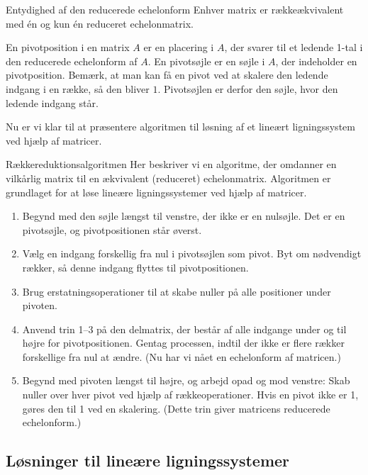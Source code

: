 \begin{theorem}{Entydighed af den reducerede echelonform}
    Enhver matrix er rækkeækvivalent med én og kun én reduceret echelonmatrix.
\end{theorem}

En pivotposition i en matrix $A$ er en placering i $A$, der svarer til et ledende 1-tal i den reducerede echelonform af $A$. En pivotsøjle er en søjle i $A$, der indeholder en pivotposition. Bemærk, at man kan få en pivot ved at skalere den ledende indgang i en række, så den bliver $1$. Pivotsøjlen er derfor den søjle, hvor den ledende indgang står.

Nu er vi klar til at præsentere algoritmen til løsning af et lineært ligningssystem ved hjælp af matricer.

\begin{custombox}{Rækkereduktionsalgoritmen}
    Her beskriver vi en algoritme, der omdanner en vilkårlig matrix til en ækvivalent
    (reduceret) echelonmatrix. Algoritmen er grundlaget for at løse lineære ligningssystemer ved hjælp af matricer.

    \begin{enumerate}
        \item Begynd med den søjle længst til venstre, der ikke er en nulsøjle. Det er en pivotsøjle, og pivotpositionen står øverst.
        \item Vælg en indgang forskellig fra nul i pivotsøjlen som pivot. Byt om nødvendigt rækker, så denne indgang flyttes til pivotpositionen.
        \item Brug erstatningsoperationer til at skabe nuller på alle positioner under pivoten.
        \item Anvend trin 1--3 på den delmatrix, der består af alle indgange under og til højre for pivotpositionen. Gentag processen, indtil der ikke er flere rækker forskellige fra nul at ændre. (Nu har vi nået en echelonform af matricen.)
        \item Begynd med pivoten længst til højre, og arbejd opad og mod venstre: Skab nuller over hver pivot ved hjælp af rækkeoperationer. Hvis en pivot ikke er 1, gøres den til 1 ved en skalering. (Dette trin giver matricens reducerede echelonform.)
    \end{enumerate}

\end{custombox}

\subsection*{Løsninger til lineære ligningssystemer}

